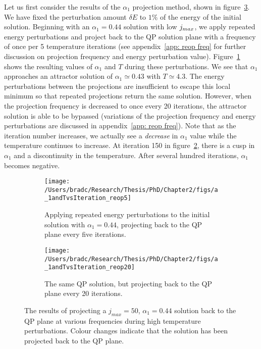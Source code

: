 \documentclass[../PhD.tex]{subfiles}
\begin{document}
Let us first consider the results of the $\alpha_1$ projection method, shown in figure~\ref{fig: reop comparisons}. We have fixed the perturbation amount $\delta E$ to $1\%$ of the energy of the initial solution. Beginning with an $\alpha_1 = 0.44$ solution with low $j_{max}$, we apply repeated energy perturbations and project back to the QP solution plane with a frequency of once per 5 temperature iterations (see appendix~\ref{app: reop freq} for further discussion  on projection frequency and energy perturbation value). Figure~\ref{fig: a_1andTa0.2reop5} shows the resulting values of $\alpha_1$ and $T$ during these perturbations. We see that $\alpha_1$ approaches an attractor solution of $\alpha_1 \simeq 0.43$ with $T \simeq 4.3$. The energy perturbations between the projections are insufficient to escape this local minimum so that repeated projections return the same solution. However, when the projection frequency is decreased to once every 20 iterations, the attractor solution is able to be bypassed (variations of the projection frequency and energy perturbations are discussed in appendix~\ref{app: reop freq}). Note that as the iteration number increases, we actually see a \emph{decrease} in $\alpha_1$ value while the temperature continues to increase. At iteration 150 in figure~\ref{fig: a_1andTa.2reop20}, there is a cusp in $\alpha_1$ and a discontinuity in the temperature. After several hundred iterations, $\alpha_1$ becomes negative.

\begin{figure}[h]
	\centering
	\begin{subfigure}[t]{0.45\textwidth}
		\texttt{[image: /Users/bradc/Research/Thesis/PhD/Chapter2/figs/a\_1andTvsIteration\_reop5]}
		\caption{Applying repeated energy perturbations to the initial solution with $\alpha_1=0.44$, projecting back to the QP plane every five iterations.}
		\label{fig: a_1andTa0.2reop5}
	\end{subfigure}
	\:
	\begin{subfigure}[t]{0.45\textwidth}
		\texttt{[image: /Users/bradc/Research/Thesis/PhD/Chapter2/figs/a\_1andTvsIteration\_reop20]}
		\caption{The same QP solution, but projecting back to the QP plane every 20 iterations.}
		\label{fig: a_1andTa.2reop20}
	\end{subfigure}
	\caption[High temperature solutions resulting from projecting back to the QP solution plane at various frequencies]{The results of projecting a $j_{max}=50$, $\alpha_1 = 0.44$ solution back to the QP plane at various frequencies during high temperature perturbations. Colour changes indicate that the solution has been projected back to the QP plane.}
	\label{fig: reop comparisons}
\end{figure}
\end{document}
